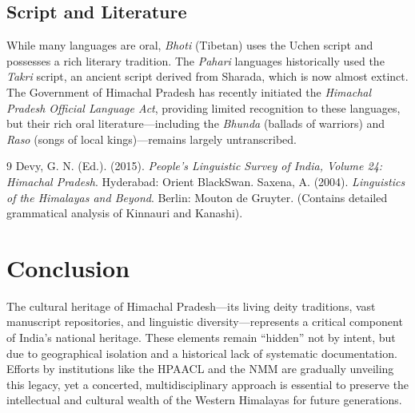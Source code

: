 \documentclass[12pt]{article}
\begin{document}
\subsection{Script and Literature}
While many languages are oral, \textit{Bhoti} (Tibetan) uses the Uchen script and possesses a rich literary tradition. The \textit{Pahari} languages historically used the \textit{Takri} script, an ancient script derived from Sharada, which is now almost extinct. The Government of Himachal Pradesh has recently initiated the \textit{Himachal Pradesh Official Language Act}, providing limited recognition to these languages, but their rich oral literature—including the \textit{Bhunda} (ballads of warriors) and \textit{Raso} (songs of local kings)—remains largely untranscribed.

\begin{thebibliography}{9}
 Devy, G. N. (Ed.). (2015). \textit{People’s Linguistic Survey of India, Volume 24: Himachal Pradesh}. Hyderabad: Orient BlackSwan.
 Saxena, A. (2004). \textit{Linguistics of the Himalayas and Beyond}. Berlin: Mouton de Gruyter. (Contains detailed grammatical analysis of Kinnauri and Kanashi).
\end{thebibliography}

\section*{Conclusion}
The cultural heritage of Himachal Pradesh—its living deity traditions, vast manuscript repositories, and linguistic diversity—represents a critical component of India’s national heritage. These elements remain “hidden” not by intent, but due to geographical isolation and a historical lack of systematic documentation. Efforts by institutions like the HPAACL and the NMM are gradually unveiling this legacy, yet a concerted, multidisciplinary approach is essential to preserve the intellectual and cultural wealth of the Western Himalayas for future generations.
\end{document}
